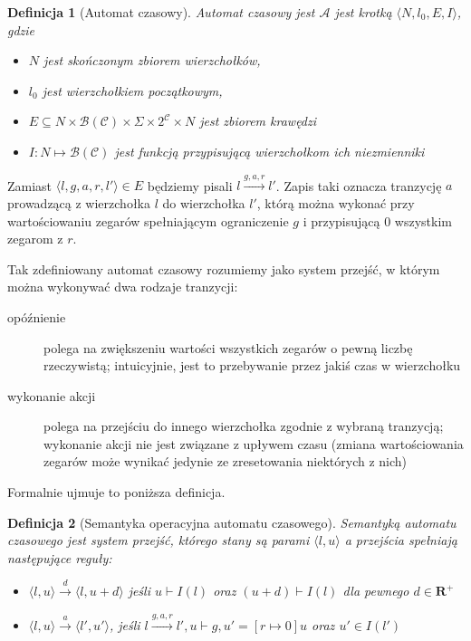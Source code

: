 \documentclass{pracamgr}
\newcommand{\pair}[2]{\langle #1, #2 \rangle}
\theoremstyle{plain}
\newtheorem{definition}{Definicja}
\begin{document}
\begin{definition}[Automat czasowy] Automat czasowy jest $\mathcal{A}$
jest krotką $\langle N, l_0, E, I\rangle$, gdzie
  \begin{itemize}
    \item $N$ jest skończonym zbiorem wierzchołków,
    \item $l_0$ jest wierzchołkiem początkowym,
    \item $E \subseteq N \times \mathcal{B}(\mathcal{C}) \times \Sigma
    \times 2^{\mathcal{C}} \times N$ jest zbiorem krawędzi
    \item $I: N \mapsto \mathcal{B}(\mathcal{C})$ jest funkcją
    przypisującą wierzchołkom ich niezmienniki
  \end{itemize}
\end{definition}
Zamiast $\langle l, g, a, r, l' \rangle \in E$ będziemy pisali $l
\stackrel{g, a, r}{\longrightarrow} l'$. Zapis taki oznacza tranzycję
$a$ prowadzącą z wierzchołka $l$ do wierzchołka $l'$, którą można
wykonać przy wartościowaniu zegarów spełniającym ograniczenie $g$ i
przypisującą $0$ wszystkim zegarom z $r$.


Tak zdefiniowany automat czasowy rozumiemy jako
system przejść, w którym można wykonywać dwa rodzaje tranzycji:
\begin{description}
  \item[opóźnienie] polega na zwiększeniu wartości wszystkich zegarów
  o pewną liczbę rzeczywistą; intuicyjnie, jest to przebywanie przez
  jakiś czas w wierzchołku
  \item[wykonanie akcji] polega na przejściu do innego wierzchołka
  zgodnie z wybraną tranzycją; wykonanie akcji nie jest związane z
  upływem czasu (zmiana wartościowania zegarów może wynikać jedynie ze
  zresetowania niektórych z nich)
\end{description}
Formalnie ujmuje to poniższa definicja.
\begin{definition}[Semantyka operacyjna automatu czasowego] Semantyką
  automatu czasowego jest system przejść, którego stany są parami
$\langle l, u \rangle$ a przejścia spełniają następujące reguły:
  \begin{itemize}
    \item $\pair{l}{u} \stackrel{d}{\longrightarrow} \pair{l}{u+d}$
    jeśli $u \vdash I(l)$ oraz $(u+d) \vdash I(l)$ dla pewnego $d \in
    \mathbf{R}^{+}$
    \item $\pair{l}{u} \stackrel{a}{\longrightarrow} \pair{l'}{u'}$,
    jeśli $l \stackrel{g, a, r}{\longrightarrow} l', u \vdash g, u' =
    [r \mapsto 0]u$ oraz $u' \in I(l')$
  \end{itemize}
\end{definition}
\end{document}
